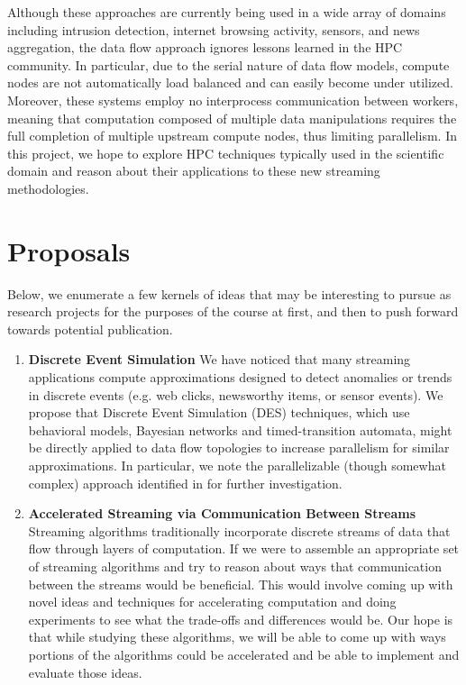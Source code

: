 \documentclass[11pt,letterpaper]{article}
\begin{document}
Although these approaches are currently being used in a wide array of domains including intrusion detection, internet browsing activity, sensors, and news aggregation, the data flow approach ignores lessons learned in the HPC community. In particular, due to the serial nature of data flow models, compute nodes are not automatically load balanced and can easily become under utilized. Moreover, these systems employ no interprocess communication between workers, meaning that computation composed of multiple data manipulations requires the full completion of multiple upstream compute nodes, thus limiting parallelism. In this project, we hope to explore HPC techniques typically used in the scientific domain and reason about their applications to these new streaming methodologies.


\section*{Proposals}

Below, we enumerate a few kernels of ideas that may be interesting to pursue as research projects for the purposes of the course at first, and then to push forward towards potential publication.

\begin{enumerate}

    \item \textbf{Discrete Event Simulation} We have noticed that many streaming applications compute approximations designed to detect anomalies or trends in discrete events (e.g. web clicks, newsworthy items, or sensor events). We propose that Discrete Event Simulation (DES) techniques, which use behavioral models, Bayesian networks and timed-transition automata, might be directly applied to data flow topologies to increase parallelism for similar approximations. In particular, we note the parallelizable (though somewhat complex) approach identified in \cite{klerx2014model} for further investigation.

    \item \textbf{Accelerated Streaming via Communication Between Streams}
    Streaming algorithms traditionally incorporate discrete streams of data that flow through layers of computation. If we were to assemble an appropriate set of streaming algorithms and try to reason about ways that communication between the streams would be beneficial. This would involve coming up with novel ideas and techniques for accelerating computation and doing experiments to see what the trade-offs and differences would be. Our hope is that while studying these algorithms, we will be able to come up with ways portions of the algorithms could be accelerated and be able to implement and evaluate those ideas.

\end{enumerate}



\end{document}
